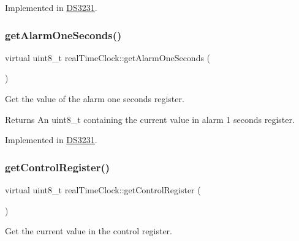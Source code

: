 Implemented in \mbox{\hyperlink{class_d_s3231_ae11a0dcc34e9c8a9b875989172339957}{D\+S3231}}.

\mbox{\label{classreal_time_clock_af4ff1775432a08af7e41db135d16bf65}} 
\subsubsection{\texorpdfstring{get\+Alarm\+One\+Seconds()}{getAlarmOneSeconds()}}
{\footnotesize\ttfamily virtual uint8\+\_\+t real\+Time\+Clock\+::get\+Alarm\+One\+Seconds (\begin{DoxyParamCaption}{ }\end{DoxyParamCaption})\hspace{0.3cm}{\ttfamily [pure virtual]}}



Get the value of the alarm one seconds register. 

\begin{DoxyReturn}{Returns}
An uint8\+\_\+t containing the current value in alarm 1 seconds register. 
\end{DoxyReturn}


Implemented in \mbox{\hyperlink{class_d_s3231_afd2b16482de8abc10981fdfca0e181a6}{D\+S3231}}.

\mbox{\label{classreal_time_clock_a13820319507d89a62a5b37b252ea6d0d}} 
\subsubsection{\texorpdfstring{get\+Control\+Register()}{getControlRegister()}}
{\footnotesize\ttfamily virtual uint8\+\_\+t real\+Time\+Clock\+::get\+Control\+Register (\begin{DoxyParamCaption}{ }\end{DoxyParamCaption})\hspace{0.3cm}{\ttfamily [virtual]}}



Get the current value in the control register. 

